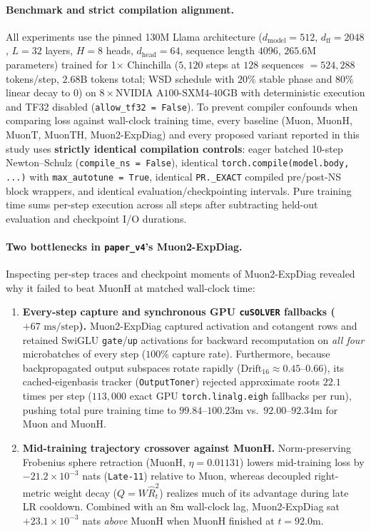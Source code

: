 \documentclass[11pt]{article}
\newcommand{\dm}{d_{\mathrm{model}}}
\newcommand{\dff}{d_{\mathrm{ff}}}
\newcommand{\dhd}{d_{\mathrm{head}}}
\newcommand{\mname}[1]{#1}
\begin{document}
\paragraph{Benchmark and strict compilation alignment.}
All experiments use the pinned 130M Llama architecture ($\dm = 512$, $\dff = 2048$, $L = 32$ layers, $H = 8$ heads, $\dhd = 64$, sequence length $4096$, $265.6\text{M}$ parameters) trained for 1$\times$ Chinchilla ($5{,}120$ steps at $128$ sequences $= 524{,}288$ tokens/step, $2.68\text{B}$ tokens total; WSD schedule with $20\%$ stable phase and $80\%$ linear decay to $0$) on $8\times\text{NVIDIA A100-SXM4-40GB}$ with deterministic execution and TF32 disabled (\texttt{allow\_tf32 = False}). To prevent compiler confounds when comparing loss against wall-clock training time, every baseline (\mname{Muon}, \mname{MuonH}, \mname{MuonT}, \mname{MuonTH}, \mname{Muon2-ExpDiag}) and every proposed variant reported in this study uses \textbf{strictly identical compilation controls}: eager batched 10-step Newton--Schulz (\texttt{compile\_ns = False}), identical \texttt{torch.compile(model.body, ...)} with \texttt{max\_autotune = True}, identical \texttt{PR.\_EXACT} compiled pre/post-NS block wrappers, and identical evaluation/checkpointing intervals. Pure training time sums per-step execution across all steps after subtracting held-out evaluation and checkpoint I/O durations.

\paragraph{Two bottlenecks in \texttt{paper\_v4}'s \mname{Muon2-ExpDiag}.}
Inspecting per-step traces and checkpoint moments of \mname{Muon2-ExpDiag} revealed why it failed to beat \mname{MuonH} at matched wall-clock time:
\begin{enumerate}
  \item \textbf{Every-step capture and synchronous GPU \texttt{cuSOLVER} fallbacks ($+67\text{ ms/step}$).} \mname{Muon2-ExpDiag} captured activation and cotangent rows and retained SwiGLU \texttt{gate}/\texttt{up} activations for backward recomputation on \emph{all four} microbatches of every step ($100\%$ capture rate). Furthermore, because backpropagated output subspaces rotate rapidly ($\text{Drift}_{16} \approx 0.45\text{--}0.66$), its cached-eigenbasis tracker (\texttt{OutputToner}) rejected approximate roots $22.1$ times per step ($113{,}000$ exact GPU \texttt{torch.linalg.eigh} fallbacks per run), pushing total pure training time to $99.84\text{--}100.23\text{m}$ vs.\ $92.00\text{--}92.34\text{m}$ for \mname{Muon} and \mname{MuonH}.
  \item \textbf{Mid-training trajectory crossover against \mname{MuonH}.} Norm-preserving Frobenius sphere retraction (\mname{MuonH}, $\eta = 0.01131$) lowers mid-training loss by $-21.2\times 10^{-3}$ nats (\texttt{Late-11}) relative to \mname{Muon}, whereas decoupled right-metric weight decay ($Q = W\hat{R}_t^2$) realizes much of its advantage during late LR cooldown. Combined with an $8\text{m}$ wall-clock lag, \mname{Muon2-ExpDiag} sat $+23.1\times 10^{-3}$ nats \emph{above} \mname{MuonH} when \mname{MuonH} finished at $t = 92.0\text{m}$.
\end{enumerate}
\end{document}
